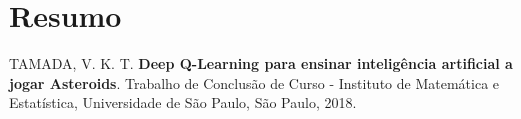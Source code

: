 %
%
%
%

\chapter*{Resumo}
%
\noindent%
TAMADA, V. K. T. \textbf{Deep Q-Learning para ensinar inteligência artificial a jogar Asteroids}. Trabalho de Conclusão de Curso
 - Instituto de Matemática e Estatística, Universidade de São Paulo,
São Paulo, 2018.
\\

